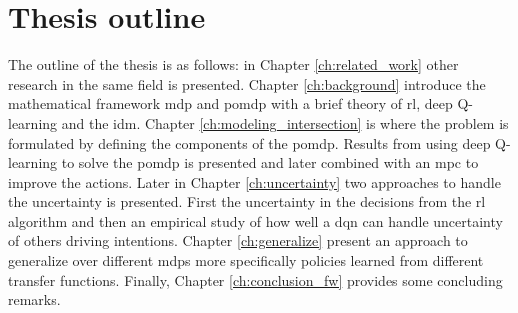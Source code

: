 \section{Thesis outline}
The outline of the thesis is as follows: in Chapter \ref{ch:related_work} other research in the same field is presented. Chapter \ref{ch:background} introduce the mathematical framework \gls{mdp} and \gls{pomdp} with a brief theory of \gls{rl}, deep Q-learning and the \gls{idm}. 
Chapter \ref{ch:modeling_intersection} is where the problem is formulated by defining the components of the \gls{pomdp}. Results from using deep Q-learning to solve the \gls{pomdp} is presented and later combined with an \gls{mpc} to improve the actions. Later in Chapter \ref{ch:uncertainty} two approaches to handle the uncertainty is presented. First the uncertainty in the decisions from the \gls{rl} algorithm and then an empirical study of how well a \gls{dqn} can handle uncertainty of others driving intentions. Chapter \ref{ch:generalize} present an approach to generalize over different \gls{mdp}s more specifically policies learned from different transfer functions. Finally, Chapter \ref{ch:conclusion_fw} provides some concluding remarks. 

